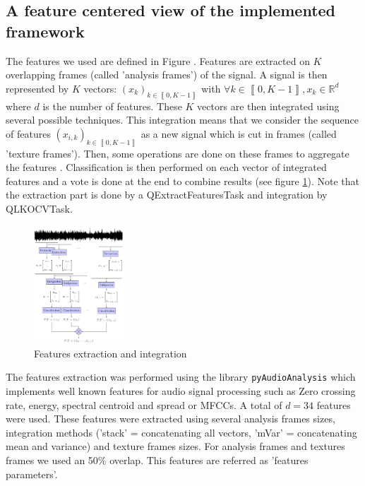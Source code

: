 \documentclass[10pt, conference, compsocconf]{IEEEtran}
\newcommand{\iseg}[1]{{\left\llbracket #1 \right\rrbracket}} %
\newcommand{\rset}{\mathbb{R}}
\begin{document}
\subsection{A feature centered view of the implemented framework} \label{subsec:extraction}
The features we used are defined in Figure \cite{pyAudioAnalysis}. 
Features are extracted on $K$ overlapping frames (called 'analysis frames') of the signal. A signal is then represented by $K$ vectors: $(x_k)_{k \in \iseg{0,K-1}}$ with $\forall k \in \iseg{0, K-1}, x_k \in \rset^d$ where $d$ is the number of features. These $K$ vectors are then integrated using several possible techniques. This integration means that we consider the sequence of features  $\left(x_{i,k}\right)_{k \in \iseg{0,K-1}}$ as a new signal which is cut in frames (called 'texture frames'). Then, some operations are done on these frames to aggregate the features \cite{DBLP:journals/taslp/JoderER09}. Classification is then performed on each vector of integrated features and a vote is done at the end to combine results (see figure \ref{fig:integration}). Note that the extraction part is done by a QExtractFeaturesTask and integration by QLKOCVTask.
\begin{figure}[h]
  \begin{center}
    \includegraphics[width=0.3\textwidth]{Figures/integration.pdf}
  \end{center}
  \caption{Features extraction and integration \label{fig:integration}} 
\end{figure}

The features extraction was performed using the library \texttt{pyAudioAnalysis} \cite{pyAudioAnalysis} which implements well known features for audio signal processing such as Zero crossing rate, energy, spectral centroid and spread or MFCCs. A total of $d=34$ features were used. These features were extracted using several analysis frames sizes, integration methods ('stack' = concatenating all vectors, 'mVar' = concatenating mean and variance) and texture frames sizes. For analysis frames and textures frames we used an 50\% overlap. This features are referred as 'features parameters'. 
\end{document}
